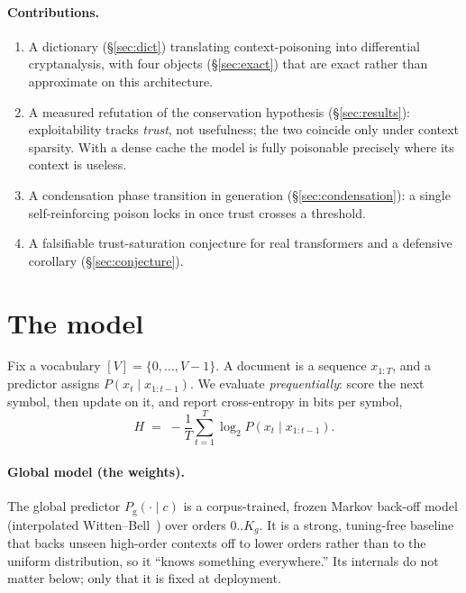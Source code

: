 \documentclass[11pt]{article}
\theoremstyle{plain}
\theoremstyle{definition}
\theoremstyle{remark}
\newcommand{\Pglob}{P_{\text{g}}}
\begin{document}
\paragraph{Contributions.}
\begin{enumerate}\itemsep2pt
\item A dictionary (\S\ref{sec:dict}) translating context-poisoning into differential
cryptanalysis, with four objects (\S\ref{sec:exact}) that are exact rather than approximate
on this architecture.
\item A measured refutation of the conservation hypothesis (\S\ref{sec:results}):
exploitability tracks \emph{trust}, not usefulness; the two coincide only under context
sparsity. With a dense cache the model is fully poisonable precisely where its context is
useless.
\item A condensation phase transition in generation (\S\ref{sec:condensation}): a single
self-reinforcing poison locks in once trust crosses a threshold.
\item A falsifiable trust-saturation conjecture for real transformers and a defensive
corollary (\S\ref{sec:conjecture}).
\end{enumerate}

\section{The model}\label{sec:model}
Fix a vocabulary $[V]=\{0,\dots,V-1\}$. A document is a sequence $x_{1:T}$, and a predictor
assigns $P(x_t\mid x_{1:t-1})$. We evaluate \emph{prequentially}: score the next symbol,
then update on it, and report cross-entropy in bits per symbol,
\begin{equation}\label{eq:xent}
H \;=\; -\frac1T\sum_{t=1}^{T}\log_2 P\!\left(x_t \mid x_{1:t-1}\right).
\end{equation}

\paragraph{Global model (the weights).}
The global predictor $\Pglob(\cdot\mid c)$ is a corpus-trained, frozen Markov back-off model
(interpolated Witten--Bell~\cite{goodman2001}) over orders $0..K_g$. It is a strong,
tuning-free baseline that backs unseen high-order contexts off to lower orders rather than
to the uniform distribution, so it ``knows something everywhere.'' Its internals do not
matter below; only that it is fixed at deployment.
\end{document}
